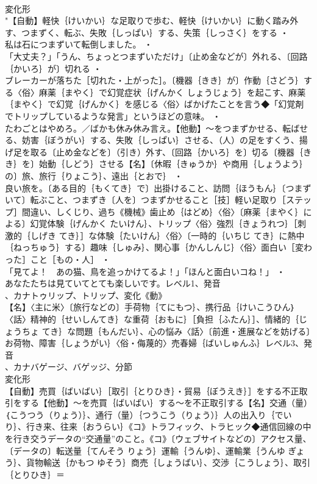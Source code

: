 \documentclass[8pt]{extreport}
\begin{document}
\begin{CJK}{UTF8}{min}
\\	変化形 
\\	"【自動】軽快｛けいかい｝な足取りで歩む、軽快｛けいかい｝に動く踏み外す、つまずく、転ぶ、失敗｛しっぱい｝する、失策｛しっさく｝をする ・
\\	私は石につまずいて転倒しました。 ・
\\	「大丈夫？」「うん、ちょっとつまずいただけ」〔止め金などが〕外れる、〔回路｛かいろ｝が〕切れる ・
\\	ブレーカーが落ちた［切れた・上がった］。〔機器｛きき｝が〕作動｛さどう｝する〈俗〉麻薬｛まやく｝で幻覚症状｛げんかく しょうじょう｝を起こす、麻薬｛まやく｝で幻覚｛げんかく｝を感じる〈俗〉ばかげたことを言う◆「幻覚剤でトリップしているような発言」というほどの意味。 ・
\\	たわごとはやめろ。／ばかも休み休み言え。【他動】～をつまずかせる、転ばせる、妨害｛ぼうがい｝する、失敗｛しっぱい｝させる、（人）の足をすくう、揚げ足を取る〔止め金などを〕（引き）外す、〔回路｛かいろ｝を〕切る〔機器｛きき｝を〕始動｛しどう｝させる【名】〔休暇｛きゅうか｝や商用｛しょうよう｝の〕旅、旅行｛りょこう｝、遠出｛とおで｝ ・
\\	良い旅を。〔ある目的｛もくてき｝で〕出掛けること、訪問｛ほうもん｝〔つまずいて〕転ぶこと、つまずき〔人を〕つまずかせること［技］軽い足取り［ステップ］間違い、しくじり、過ち《機械》歯止め｛はどめ｝〈俗〉〔麻薬｛まやく｝による〕幻覚体験｛げんかく たいけん｝、トリップ〈俗〉強烈｛きょうれつ｝［刺激的｛しげき てき｝］な体験｛たいけん｝〈俗〉〔一時的｛いちじ てき｝に熱中｛ねっちゅう｝する〕趣味｛しゅみ｝、関心事｛かんしんじ｝〈俗〉面白い［変わった］こと［もの・人］ ・
\\	「見てよ！　あの猫、鳥を追っかけてるよ！」「ほんと面白いコね！」 ・
\\	あなたたちは見ていてとても楽しいです。レベル1、発音
\\	、カナトゥリップ、トリップ、変化《動》
\\	【名】〈主に米〉〔旅行などの〕手荷物｛てにもつ｝、携行品｛けいこうひん｝〈話〉精神的｛せいしんてき｝な重荷｛おもに｝［負担｛ふたん｝］、情緒的｛じょうちょ てき｝な問題｛もんだい｝、心の悩み〈話〉〔前進・進展などを妨げる〕お荷物、障害｛しょうがい｝〈俗・侮蔑的〉売春婦｛ばいしゅんふ｝レベル3、発音
\\	、カナバゲージ、バゲッジ、分節
\\	変化形 
\\	【自動】売買｛ばいばい｝［取引｛とりひき｝・貿易｛ぼうえき｝］をする不正取引をする【他動】～を売買｛ばいばい｝する～を不正取引する【名】交通（量）｛こうつう（りょう）｝、通行（量）｛つうこう（りょう）｝人の出入り｛でいり｝、行き来、往来｛おうらい｝《コ》トラフィック、トラヒック◆通信回線の中を行き交うデータの“交通量”のこと。《コ》〔ウェブサイトなどの〕アクセス量、〔データの〕転送量｛てんそう りょう｝運輸｛うんゆ｝、運輸業｛うんゆ ぎょう｝、貨物輸送｛かもつ ゆそう｝商売｛しょうばい｝、交渉｛こうしょう｝、取引｛とりひき｝＝ 

\end{CJK}
\end{document}
